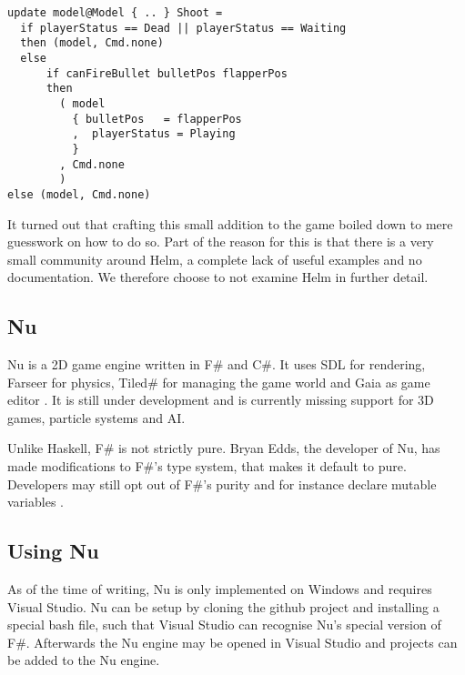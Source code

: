 \begin{lstlisting}[style=haskell-highlight,label={lst:haskell:shoot},caption={Haskell Shoot}]
update model@Model { .. } Shoot =
  if playerStatus == Dead || playerStatus == Waiting
  then (model, Cmd.none)
  else
      if canFireBullet bulletPos flapperPos
      then
        ( model
          { bulletPos   = flapperPos 
          ,  playerStatus = Playing
          }
        , Cmd.none
        )
else (model, Cmd.none)
\end{lstlisting}

It turned out that crafting this small addition to the game boiled down to mere guesswork on how to do so. Part of the reason for this is that there is a very small community around Helm, a complete lack of useful examples and no documentation. We therefore choose to not examine Helm in further detail.

\subsection{Nu}
Nu is a 2D game engine written in F\# and C\#. It uses \ac{SDL} for rendering, Farseer for physics, Tiled\# for managing the game world and Gaia as game editor \cite{nu:github}. It is still under development and is currently missing support for 3D games, particle systems and AI.

Unlike Haskell, F\# is not strictly pure. Bryan Edds, the developer of Nu, has made modifications to F\#'s type system, that makes it default to pure. Developers may still opt out of F\#'s purity and for instance declare mutable variables \cite{nu:pdf}.

\subsection{Using Nu}
As of the time of writing, Nu is only implemented on Windows and requires Visual Studio. Nu can be setup by cloning the github project and installing a special bash file, such that Visual Studio can recognise Nu's special version of F\#. Afterwards the Nu engine may be opened in Visual Studio and projects can be added to the Nu engine.

